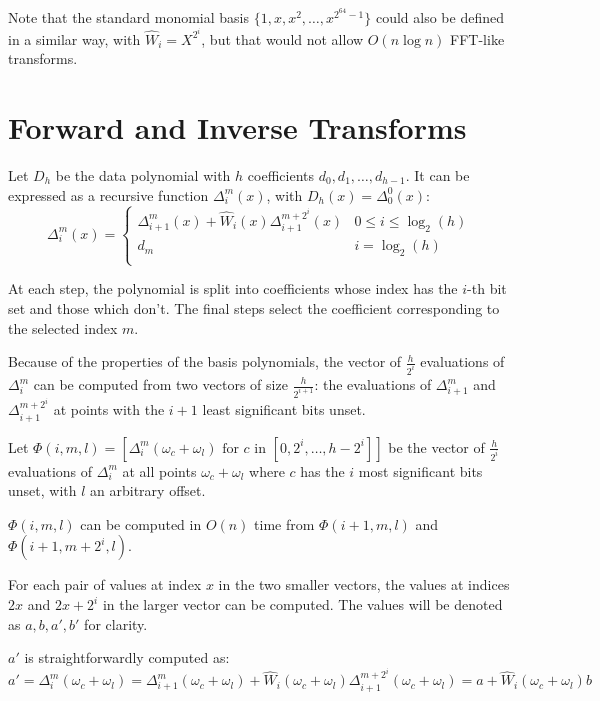 Note that the standard monomial basis $\{1, x, x^2, \ldots, x^{2^{64} - 1}\}$ could also be defined in a similar way, with $\hat{W}_i = X^{2^{i}}$, but that would not allow $O(n \log n)$ FFT-like transforms.

\section{Forward and Inverse Transforms}

Let $D_h$ be the data polynomial with $h$ coefficients $d_0, d_1, \ldots, d_{h - 1}$. It can be expressed as a recursive function $\Delta_i^m(x)$, with $D_h(x) = \Delta_0^0(x)$:
\[
\Delta_i^m(x) = \begin{cases}
    \Delta_{i+1}^m(x) + \hat{W}_i(x) \Delta_{i+1}^{m+2^i}(x) & 0 \leq i \le \log_2(h) \\
    d_m & i = \log_2(h) \\
    \end{cases}
\]

At each step, the polynomial is split into coefficients whose index has the $i$-th bit set and those which don't. The final steps select the coefficient corresponding to the selected index $m$.

Because of the properties of the basis polynomials, the vector of $\frac{h}{2^i}$ evaluations of $\Delta_i^m$ can be computed from two vectors of size $\frac{h}{2^{i + 1}}$: the evaluations of $\Delta_{i+1}^m$ and $\Delta_{i+1}^{m + 2^i}$ at points with the $i + 1$ least significant bits unset.

Let $\Phi(i, m, l) = [\Delta_i^m(\omega_c + \omega_l) \text{ for } c \text{ in } [0, 2^i, \ldots, h - 2^i]]$ be the vector of $\frac{h}{2^i}$ evaluations of $\Delta_i^m$ at all points $\omega_c + \omega_l$ where $c$ has the $i$ most significant bits unset, with $l$ an arbitrary offset.

$\Phi(i, m, l)$ can be computed in $O(n)$ time from $\Phi(i + 1, m, l)$ and $\Phi(i + 1, m + 2^i, l)$.

For each pair of values at index $x$ in the two smaller vectors, the values at indices $2x$ and $2x + 2^i$ in the larger vector can be computed. The values will be denoted as $a, b, a', b'$ for clarity.

$a'$ is straightforwardly computed as:
\[a' = \Delta_i^m(\omega_c + \omega_l) = \Delta_{i+1}^m(\omega_c + \omega_l) + \hat{W}_i(\omega_c + \omega_l) \Delta_{i+1}^{m + 2^i}(\omega_c + \omega_l) = a + \hat{W}_i(\omega_c + \omega_l) b\]


